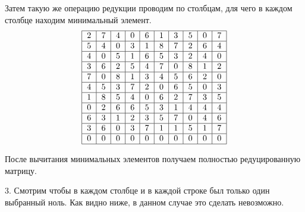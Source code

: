 \documentclass{article}
\begin{document}
Затем такую же операцию редукции проводим по столбцам, для чего в каждом столбце находим минимальный элемент.
\[
    \begin{tabular}{|c|c|c|c|c|c|c|c|c|c|}
        \hline
        2 & 7 & 4 & 0 & 6 & 1 & 3 & 5 & 0 & 7 \\
        \hline
        5 & 4 & 0 & 3 & 1 & 8 & 7 & 2 & 6 & 4 \\
        \hline
        4 & 0 & 5 & 1 & 6 & 5 & 3 & 2 & 4 & 0 \\
        \hline
        3 & 6 & 2 & 5 & 4 & 7 & 0 & 8 & 1 & 2 \\
        \hline
        7 & 0 & 8 & 1 & 3 & 4 & 5 & 6 & 2 & 0 \\
        \hline
        4 & 5 & 3 & 7 & 2 & 0 & 6 & 5 & 0 & 3 \\
        \hline
        1 & 8 & 5 & 4 & 0 & 6 & 2 & 7 & 3 & 5 \\
        \hline
        0 & 2 & 6 & 6 & 5 & 3 & 1 & 4 & 4 & 4 \\
        \hline
        6 & 3 & 1 & 2 & 3 & 5 & 7 & 0 & 4 & 6 \\
        \hline
        3 & 6 & 0 & 3 & 7 & 1 & 1 & 5 & 1 & 7 \\
        \hline
        0 & 0 & 0 & 0 & 0 & 0 & 0 & 0 & 0 & 0 \\
        \hline
    \end{tabular}
\]

После вычитания минимальных элементов получаем полностью редуцированную матрицу.

3. Смотрим чтобы в каждом столбце и в каждой строке был только один выбранный ноль. Как видно ниже, в данном случае это сделать невозможно.
\end{document}
